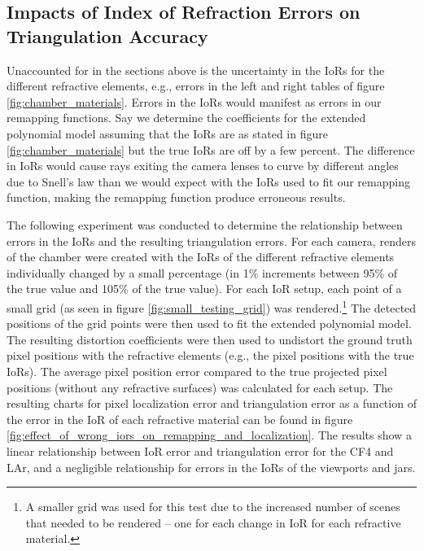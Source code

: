 \documentclass[11pt, letterpaper]{extarticle} %
\begin{document}
\subsection{Impacts of Index of Refraction Errors on Triangulation Accuracy}\label{subsec:impacts_of_index_of_refraction_errors_on_triangulation}
Unaccounted for in the sections above is the uncertainty in the IoRs for the different refractive elements, e.g., errors in the left and right tables of figure \ref{fig:chamber_materials}. Errors in the IoRs would manifest as errors in our remapping functions. Say we determine the coefficients for the extended polynomial model assuming that the IoRs are as stated in figure \ref{fig:chamber_materials} but the true IoRs are off by a few percent. The difference in IoRs would cause rays exiting the camera lenses to curve by different angles due to Snell's law than we would expect with the IoRs used to fit our remapping function, making the remapping function produce erroneous results. 

The following experiment was conducted to determine the relationship between errors in the IoRs and the resulting triangulation errors. For each camera, renders of the chamber were created with the IoRs of the different refractive elements individually changed by a small percentage (in 1\% increments between 95\% of the true value and 105\% of the true value). For each IoR setup, each point of a small grid (as seen in figure \ref{fig:small_testing_grid}) was rendered.\footnote{A smaller grid was used for this test due to the increased number of scenes that needed to be rendered -- one for each change in IoR for each refractive material.} The detected positions of the grid points were then used to fit the extended polynomial model. The resulting distortion coefficients were then used to undistort the ground truth pixel positions with the refractive elements (e.g., the pixel positions with the true IoRs). The average pixel position error compared to the true projected pixel positions (without any refractive surfaces) was calculated for each setup. The resulting charts for pixel localization error and triangulation error as a function of the error in the IoR of each refractive material can be found in figure \ref{fig:effect_of_wrong_iors_on_remapping_and_localization}. The results show a linear relationship between IoR error and triangulation error for the CF4 and LAr, and a negligible relationship for errors in the IoRs of the viewports and jars.
\end{document}
